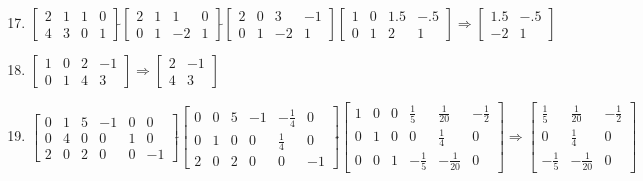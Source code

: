 \documentclass[12pt]{article}
\begin{document}
\begin{enumerate}
    \setcounter{enumi}{16}

  \item $\begin{bmatrix} 2 & 1 & 1 & 0\\ 4 & 3 & 0 & 1  \end{bmatrix}\widetilde{ }\begin{bmatrix} 2 & 1 & 1 & 0\\ 0 & 1 & -2 & 1  \end{bmatrix}\widetilde{ }\begin{bmatrix} 2 & 0 & 3 & -1\\ 0 & 1 & -2 & 1  \end{bmatrix}\begin{bmatrix} 1 & 0 & 1.5 & -.5\\ 0 & 1 & 2 & 1\end{bmatrix}\Rightarrow\begin{bmatrix} 1.5 & -.5\\ -2 & 1\end{bmatrix}$

    \setcounter{enumi}{18}

  \item $\begin{bmatrix} 1 & 0 & 2 & -1\\ 0 & 1 & 4 & 3  \end{bmatrix}\Rightarrow\begin{bmatrix} 2 & -1\\ 4 & 3\end{bmatrix}$

    \setcounter{enumi}{20}

  \item $\begin{bmatrix} 0 & 1 & 5 & -1 & 0 & 0\\ 0 & 4 & 0 & 0 & 1 & 0\\ 2 & 0 & 2 & 0 & 0 & -1  \end{bmatrix}\widetilde{ }\begin{bmatrix} 0 & 0 & 5 & -1 & -\frac{1}{4} & 0\\ 0 & 1 & 0 & 0 & \frac{1}{4} & 0\\ 2 & 0 & 2 & 0 & 0 & -1  \end{bmatrix}\widetilde{ }\begin{bmatrix} 1 & 0 & 0 & \frac{1}{5} & \frac{1}{20} & -\frac{1}{2}\\ 0 & 1 & 0 & 0 & \frac{1}{4} & 0\\ 0 & 0 & 1 & -\frac{1}{5} & -\frac{1}{20} & 0  \end{bmatrix}\Rightarrow\begin{bmatrix} \frac{1}{5} & \frac{1}{20} & -\frac{1}{2}\\ 0 & \frac{1}{4} & 0\\ -\frac{1}{5} & -\frac{1}{20} & 0 \end{bmatrix}$


\end{enumerate}
\end{document}
